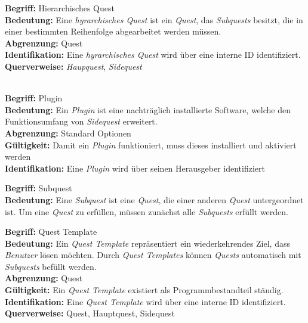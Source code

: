 \documentclass{article}
\begin{document}
\begin{samepage}
\textbf{Begriff:} Hierarchisches Quest \\
\textbf{Bedeutung:} Eine \textit{hyrarchisches Quest} ist ein \textit{Quest}, das \textit{Subquests} besitzt, die in einer bestimmten Reihenfolge abgearbeitet werden müssen.  \\
\textbf{Abgrenzung:} Quest \\
\textbf{Identifikation:} Eine \textit{hyrarchisches Quest} wird über eine interne ID identifiziert. \\
\textbf{Querverweise:} \textit{Haupquest}, \textit{Sidequest} \\ \\
\end{samepage}

\begin{samepage}
\textbf{Begriff:} Plugin \\
\textbf{Bedeutung:} Ein \textit{Plugin} ist eine nachträglich installierte Software, welche den Funktionsumfang von \textit{Sidequest} erweitert. \\
\textbf{Abgrenzung:} Standard Optionen \\
\textbf{Gültigkeit:} Damit ein \textit{Plugin} funktioniert, muss dieses installiert und aktiviert werden  \\
\textbf{Identifikation:} Eine \textit{Plugin} wird über seinen Herausgeber identifiziert \\
\end{samepage}

\begin{samepage}
\textbf{Begriff:} Subquest \\
\textbf{Bedeutung:} Eine \textit{Subquest} ist eine \textit{Quest}, die einer anderen \textit{Quest} untergeordnet ist. Um eine \textit{Quest} zu erfüllen, müssen zunächst alle \textit{Subquests} erfüllt werden. \\
\end{samepage}

\begin{samepage}
\textbf{Begriff:} Quest Template \\
\textbf{Bedeutung:} Ein \textit{Quest Template} repräsentiert ein wiederkehrendes Ziel, dass \textit{Benutzer} lösen möchten. Durch \textit{Quest Templates} können \textit{Quests} automatisch mit \textit{Subquests} befüllt werden. \\
\textbf{Abgrenzung:} Quest \\
\textbf{Gültigkeit:} Ein \textit{Quest Template} existiert als Programmbestandteil ständig. \\
\textbf{Identifikation:} Eine \textit{Quest Template} wird über eine interne ID identifiziert. \\
\textbf{Querverweise:} Quest, Hauptquest, Sidequest \\ \\
\end{samepage}
\end{document}
